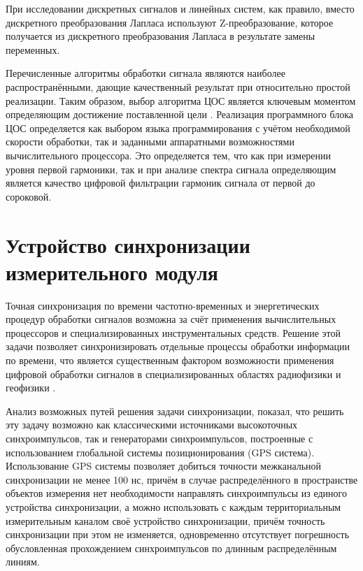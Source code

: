 \documentclass[a4paper, 14pt, titlepage]{extarticle}
\begin{document}
  При исследовании дискретных сигналов и линейных систем, как правило, вместо дискретного
  преобразования Лапласа используют Z-пре\-об\-ра\-зо\-ва\-ние, которое получается из дискретного
  преобразования Лапласа в результате замены переменных.

  Перечисленные алгоритмы обработки сигнала являются наиболее распространёнными, дающие качественный
  результат при относительно простой реализации. Таким образом, выбор алгоритма ЦОС является
  ключевым моментом определяющим достижение поставленной цели \cite{zubarev-realtime}. Реализация
  программного блока ЦОС определяется как выбором языка программирования с учётом необходимой
  скорости обработки, так и заданными аппаратными возможностями вычислительного процессора. Это
  определяется тем, что как при измерении уровня первой гармоники, так и при анализе спектра сигнала
  определяющим является качество цифровой фильтрации гармоник сигнала от первой до сороковой.

  \section{Устройство синхронизации измерительного модуля}

  Точная синхронизация по времени частотно-временных и энергетических процедур обработки
  сигналов возможна за счёт применения вычислительных процессоров и специализированных
  инструментальных средств. Решение этой задачи позволяет синхронизировать отдельные процессы
  обработки информации по времени, что является существенным фактором возможности применения
  цифровой обработки сигналов в специализированных областях радиофизики и геофизики \cite{stupin-methods}.

  Анализ возможных путей решения задачи синхронизации, показал, что решить эту задачу возможно как
  классическими источниками высокоточных синхроимпульсов, так и генераторами синхроимпульсов,
  построенные с использованием глобальной системы позиционирования (GPS система). Использование GPS
  системы позволяет добиться точности межканальной синхронизации не менее 100 нс, причём в случае
  распределённого в пространстве объектов измерения нет необходимости направлять синхроимпульсы из
  единого устройства синхронизации, а можно использовать с каждым территориальным измерительным
  каналом своё устройство синхронизации, причём точность синхронизации при этом не изменяется,
  одновременно отсутствует погрешность обусловленная прохождением синхроимпульсов по длинным
  распределённым линиям.

  \begin{flushleft}
    
    
  \end{flushleft}
\end{document}
